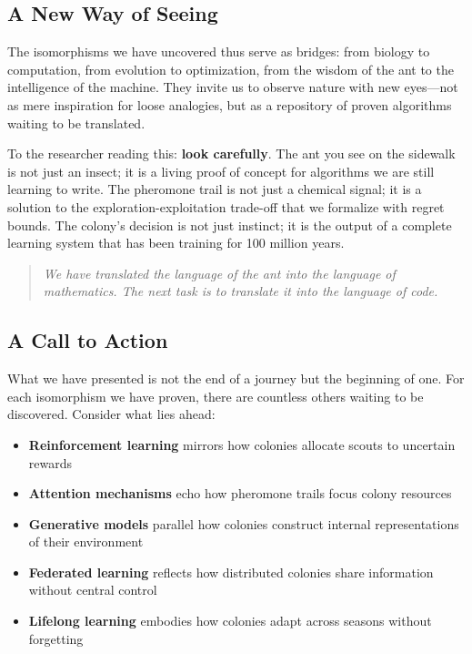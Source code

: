 \documentclass[12pt,letterpaper]{article}
\begin{document}
\subsection*{A New Way of Seeing}

The isomorphisms we have uncovered thus serve as bridges: from biology to computation, from evolution to optimization, from the wisdom of the ant to the intelligence of the machine. They invite us to observe nature with new eyes—not as mere inspiration for loose analogies, but as a repository of proven algorithms waiting to be translated.

To the researcher reading this: \textbf{look carefully}. The ant you see on the sidewalk is not just an insect; it is a living proof of concept for algorithms we are still learning to write. The pheromone trail is not just a chemical signal; it is a solution to the exploration-exploitation trade-off that we formalize with regret bounds. The colony's decision is not just instinct; it is the output of a complete learning system that has been training for 100 million years.

\begin{quote}
\emph{We have translated the language of the ant into the language of mathematics. The next task is to translate it into the language of code.}
\end{quote}

\subsection*{A Call to Action}

What we have presented is not the end of a journey but the beginning of one. For each isomorphism we have proven, there are countless others waiting to be discovered. Consider what lies ahead:

\begin{itemize}
    \item \textbf{Reinforcement learning} mirrors how colonies allocate scouts to uncertain rewards
    \item \textbf{Attention mechanisms} echo how pheromone trails focus colony resources
    \item \textbf{Generative models} parallel how colonies construct internal representations of their environment
    \item \textbf{Federated learning} reflects how distributed colonies share information without central control
    \item \textbf{Lifelong learning} embodies how colonies adapt across seasons without forgetting
\end{itemize}
\end{document}
